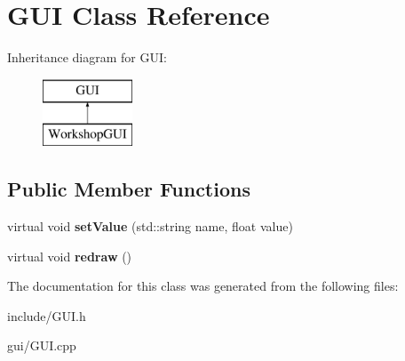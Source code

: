 \hypertarget{classGUI}{\section{G\-U\-I Class Reference}
\label{classGUI}
}
Inheritance diagram for G\-U\-I\-:\begin{figure}[H]
\begin{center}
\leavevmode
\includegraphics[height=2.000000cm]{classGUI}
\end{center}
\end{figure}
\subsection*{Public Member Functions}
\begin{DoxyCompactItemize}
\item 
\hypertarget{classGUI_ac7565b952201756e1dc1f0b9486f6b28}{virtual void {\bfseries set\-Value} (std\-::string name, float value)}\label{classGUI_ac7565b952201756e1dc1f0b9486f6b28}

\item 
\hypertarget{classGUI_a86c7f4b8bd81b4c0e191b40a134e2f9e}{virtual void {\bfseries redraw} ()}\label{classGUI_a86c7f4b8bd81b4c0e191b40a134e2f9e}

\end{DoxyCompactItemize}


The documentation for this class was generated from the following files\-:\begin{DoxyCompactItemize}
\item 
include/G\-U\-I.\-h\item 
gui/G\-U\-I.\-cpp\end{DoxyCompactItemize}

